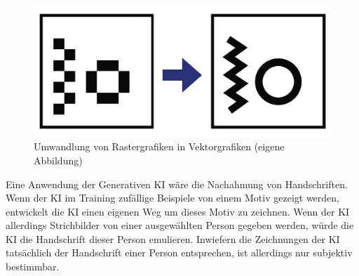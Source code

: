 \begin{figure}[!ht]
	\centering
	\includegraphics[width=\textwidth]{images/diskussion/Vector-Raster.png}
	\caption{Umwandlung von Rastergrafiken in Vektorgrafiken (eigene Abbildung)}\label{fig:vektorRaster}
\end{figure}

Eine Anwendung der Generativen KI wäre die Nachahmung von Handschriften. Wenn
der KI im Training zufällige Beispiele von einem Motiv gezeigt werden,
entwickelt die KI einen eigenen Weg um dieses Motiv zu zeichnen. Wenn der KI
allerdings Strichbilder von einer ausgewählten Person gegeben werden, würde die
KI die Handschrift dieser Person emulieren. Inwiefern die Zeichnungen der KI
tatsächlich der Handschrift einer Person entsprechen, ist allerdings nur
subjektiv bestimmbar.
